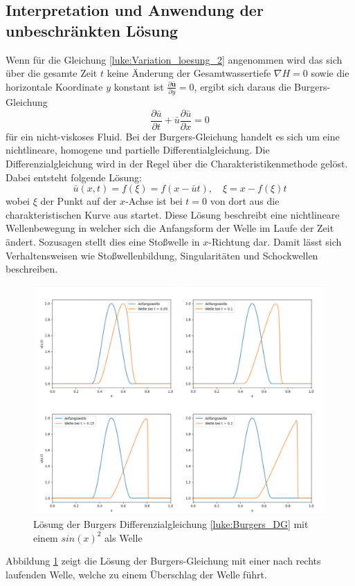 \subsection{Interpretation und Anwendung der unbeschränkten Lösung}
Wenn für die Gleichung \eqref{luke:Variation_loesung_2} angenommen wird das sich über die gesamte Zeit $t$ keine Änderung der Gesamtwassertiefe $ \nabla H = 0 $ sowie die horizontale Koordinate $y$ konstant ist $\frac{\partial \bar{\bm{u}}}{\partial y} = 0$, ergibt sich daraus die Burgers-Gleichung
\begin{equation}
	\frac{\partial \bar{u}}{\partial t} + \bar{u} \frac{\partial \bar{u}}{\partial x} = 0
	\label{luke:Burgers_DG}
\end{equation}
für ein nicht-viskoses Fluid.
Bei der Burgers-Gleichung handelt es sich um eine nichtlineare, homogene und partielle Differentialgleichung.
Die Differenzialgleichung wird in der Regel über die Charakteristikenmethode gelöst. 
Dabei entsteht folgende Lösung:
\[
\bar{u}(x,t) = f(\xi) = f(x-\bar{u}t),\quad \xi = x-f(\xi)t
\]
wobei $\xi$ der Punkt auf der $x$-Achse ist bei $t = 0$ von dort aus die charakteristischen Kurve aus startet.
Diese Lösung beschreibt eine nichtlineare Wellenbewegung in welcher sich die Anfangsform der Welle im Laufe der Zeit ändert.
Sozusagen stellt dies eine Stoßwelle in $x$-Richtung dar.
Damit lässt sich Verhaltensweisen wie Stoßwellenbildung, Singularitäten und Schockwellen beschreiben.
\begin{figure}
	\includegraphics[width=\textwidth]{papers/luke/fig/Burger_Loesung_Welle.jpg}
	\caption{Lösung der Burgers Differenzialgleichung \eqref{luke:Burgers_DG} mit einem $sin(x)^2$ als Welle
		\label{luke:fig:Loesung_Burgers}}
\end{figure}
Abbildung \ref{luke:fig:Loesung_Burgers} zeigt die Lösung der Burgers-Gleichung mit einer nach rechts laufenden Welle, welche zu einem Überschlag der Welle führt.

